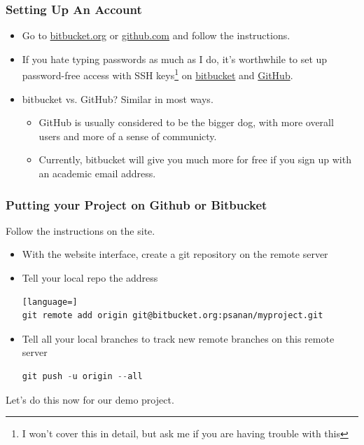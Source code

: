 \documentclass{beamer}
\begin{document}
\begin{frame}[fragile]
\frametitle{Setting Up An Account}
\begin{itemize}
\item Go to \href{https://bitbucket.org}{bitbucket.org} or \href{https://github.com}{github.com} and follow the instructions.
\item If you hate typing passwords as much as I do, it's worthwhile to set up password-free access with SSH keys\footnote{I won't cover this in detail, but ask me if you are having trouble with this} on
\href{https://confluence.atlassian.com/bitbucket/set-up-ssh-for-git-728138079.html}{bitbucket} and
\href{https://help.github.com/articles/adding-a-new-ssh-key-to-your-github-account/}{GitHub}.
\item bitbucket vs. GitHub? Similar in most ways.
\begin{itemize}
\item
GitHub is usually considered to be the bigger dog, with more overall users and more of a sense of communicty.
\item 
Currently, bitbucket will give you much more for free if you sign up with an academic email address.
\end{itemize}
\end{itemize}
\end{frame}

\begin{frame}[fragile]
\frametitle{Putting your Project on Github or Bitbucket}
Follow the instructions on the site.
\begin{itemize}
\item With the website interface, create a git repository on the remote server
\item Tell your local repo the address
\begin{lstlisting}[language=]
git remote add origin git@bitbucket.org:psanan/myproject.git
\end{lstlisting}
\item Tell all your local branches to track new remote branches on this remote server
\begin{lstlisting}[language=C++]
git push -u origin --all
\end{lstlisting}
\end{itemize}

Let's do this now for our demo project.

\end{frame}
\end{document}

